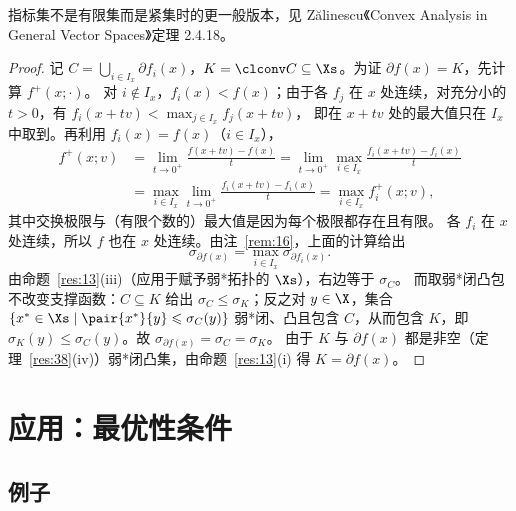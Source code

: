 指标集不是有限集而是紧集时的更一般版本，见 Zălinescu《Convex Analysis in General Vector Spaces》定理 2.4.18。

\begin{proof}
记 $C=\bigcup_{i\in I_x}\partial f_i(x)$，$K=\clconv C\subseteq\Xs$。为证 $\partial f(x)=K$，先计算 $f^+(x;\cdot)$。
对 $i\notin I_x$，$f_i(x)<f(x)$；由于各 $f_j$ 在 $x$ 处连续，对充分小的 $t>0$，有 $f_i(x+tv)<\max_{j\in I_x}f_j(x+tv)$，
即在 $x+tv$ 处的最大值只在 $I_x$ 中取到。再利用 $f_i(x)=f(x)$（$i\in I_x$），
\begin{align*}
  f^+(x;v)&=\lim_{t\to0^+}\frac{f(x+tv)-f(x)}{t}
           =\lim_{t\to0^+}\max_{i\in I_x}\frac{f_i(x+tv)-f_i(x)}{t}\\
          &=\max_{i\in I_x}\lim_{t\to0^+}\frac{f_i(x+tv)-f_i(x)}{t}
           =\max_{i\in I_x}f_i^+(x;v),
\end{align*}
其中交换极限与（有限个数的）最大值是因为每个极限都存在且有限。
各 $f_i$ 在 $x$ 处连续，所以 $f$ 也在 $x$ 处连续。由注~\ref{rem:16}，上面的计算给出
\[
  \sigma_{\partial f(x)}=\max_{i\in I_x}\sigma_{\partial f_i(x)} .
\]
由命题~\ref{res:13}(iii)（应用于赋予弱*拓扑的 $\Xs$），右边等于 $\sigma_C$。
而取弱*闭凸包不改变支撑函数：$C\subseteq K$ 给出 $\sigma_C\leqslant\sigma_K$；反之对 $y\in\X$，集合 $\{x^*\in\Xs\mid\pair{x^*}{y}\leqslant\sigma_C(y)\}$
弱*闭、凸且包含 $C$，从而包含 $K$，即 $\sigma_K(y)\leqslant\sigma_C(y)$。故 $\sigma_{\partial f(x)}=\sigma_C=\sigma_K$。
由于 $K$ 与 $\partial f(x)$ 都是非空（定理~\ref{res:38}(iv)）弱*闭凸集，由命题~\ref{res:13}(i) 得 $K=\partial f(x)$。
\end{proof}

\section{应用：最优性条件}

\subsection{例子}

